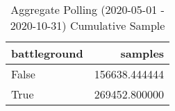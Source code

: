 \begin{table}
\centering
\caption{Aggregate Polling (2020-05-01 - 2020-10-31) Cumulative Sample}
\label{table:aggregate\_polling\_2020-05-01\_-\_2020-10-31\_cumulative\_sample}
\begin{tabular}{lr}
\toprule
 battleground &        samples \\
\midrule
        False &  156638.444444 \\
         True &  269452.800000 \\
\bottomrule
\end{tabular}
\end{table}
